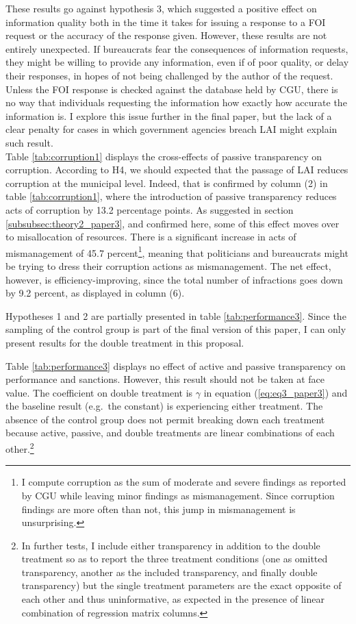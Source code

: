 \documentclass[11pt]{article}
\newcommand{\refp}[1]{(\ref{#1})}
\begin{document}
These results go against hypothesis 3, which suggested a positive effect on information quality both in the time it takes for issuing a response to a FOI request or the accuracy of the response given. However, these results are not entirely unexpected. If bureaucrats fear the consequences of information requests, they might be willing to provide any information, even if of poor quality, or delay their responses, in hopes of not being challenged by the author of the request. Unless the FOI response is checked against the database held by CGU, there is no way that individuals requesting the information how exactly how accurate the information is. I explore this issue further in the final paper, but the lack of a clear penalty for cases in which government agencies breach LAI might explain such result.\\



Table \ref{tab:corruption1} displays the cross-effects of passive transparency on corruption. According to H4, we should expected that the passage of LAI reduces corruption at the municipal level. Indeed, that is confirmed by column (2) in table \ref{tab:corruption1}, where the introduction of passive transparency reduces acts of corruption by 13.2 percentage points. As suggested in section \ref{subsubsec:theory2_paper3}, and confirmed here, some of this effect moves over to misallocation of resources. There is a significant increase in acts of mismanagement of 45.7 percent\footnote{I compute corruption as the sum of moderate and severe findings as reported by CGU while leaving minor findings as mismanagement. Since corruption findings are more often than not, this jump in mismanagement is unsurprising.}, meaning that politicians and bureaucrats might be trying to dress their corruption actions as mismanagement. The net effect, however, is efficiency-improving, since the total number of infractions goes down by 9.2 percent, as displayed in column (6).

Hypotheses 1 and 2 are partially presented in table \ref{tab:performance3}. Since the sampling of the control group is part of the final version of this paper, I can only present results for the double treatment in this proposal.
\clearpage


Table \ref{tab:performance3} displays no effect of active and passive transparency on performance and sanctions. However, this result should not be taken at face value. The coefficient on double treatment is $\gamma$ in equation \refp{eq:eq3_paper3} and the baseline result (e.g.~the constant) is experiencing either treatment. The absence of the control group does not permit breaking down each treatment because active, passive, and double treatments are linear combinations of each other.\footnote{In further tests, I include either transparency in addition to the double treatment so as to report the three treatment conditions (one as omitted transparency, another as the included transparency, and finally double transparency) but the single treatment parameters are the exact opposite of each other and thus uninformative, as expected in the presence of linear combination of regression matrix columns.}
\end{document}
